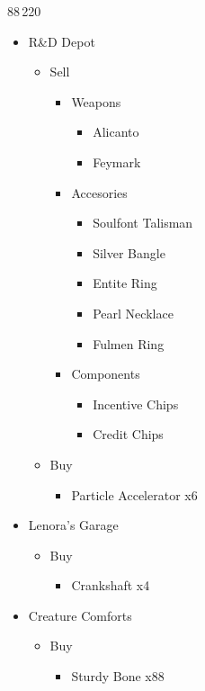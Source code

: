 \begin{shop}{88\,220}
	\begin{itemize}
		\item R\&D Depot
			\begin{itemize}
				\item Sell
					\begin{itemize}
						\item Weapons
							\begin{itemize}
								\item Alicanto
								\item Feymark
							\end{itemize}
						\item Accesories
							\begin{itemize}
								\item Soulfont Talisman
								\item Silver Bangle
								\item Entite Ring
								\item Pearl Necklace
								\item Fulmen Ring
							\end{itemize}
						\item Components
							\begin{itemize}
								\item Incentive Chips
								\item Credit Chips
							\end{itemize}
					\end{itemize}
				\item Buy
					\begin{itemize}
						\item Particle Accelerator x6
					\end{itemize}
			\end{itemize}
		\item Lenora's Garage
			\begin{itemize}
				\item Buy
					\begin{itemize}
						\item Crankshaft x4
					\end{itemize}
			\end{itemize}
		\item Creature Comforts
			\begin{itemize}
				\item Buy
					\begin{itemize}
						\item Sturdy Bone x88

\end{itemize}
\end{itemize}
\end{itemize}
\end{shop}

